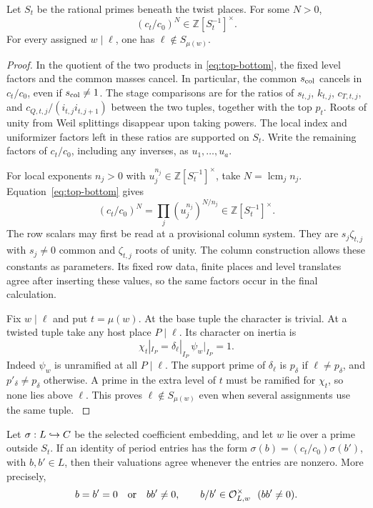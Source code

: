 \begin{lemma}
Let \(S_t\) be the rational primes beneath the twist places.
For some \(N>0\),
\[
 (c_t/c_0)^N\in\mathbb Z[S_t^{-1}]^\times .
\]
For every assigned \(w\mid\ell\), one has \(\ell\notin S_{\mu(w)}\).
\end{lemma}
\begin{proof}
In the quotient of the two products in \eqref{eq:top-bottom},
the fixed level factors and the common masses cancel. In particular,
the common \(s_{\rm col}\) cancels in \(c_t/c_0\), even if \(s_{\rm col}\ne1\).
The stage comparisons are for the ratios of
\(s_{t,j}\), \(k_{t,j}\), \(c_{T,t,j}\), and
\(c_{Q,t,j}/(i_{t,j}i_{t,j+1})\) between the two tuples,
together with the top \(p_t\). Roots of unity from Weil
splittings disappear upon taking powers. The local index and
uniformizer factors left in these ratios are supported on
\(S_t\). Write the remaining factors of \(c_t/c_0\), including any
inverses, as \(u_1,\ldots,u_a\).

For local exponents \(n_j>0\)
with \(u_j^{n_j}\in\mathbb Z[S_t^{-1}]^\times\), take
\(N=\operatorname{lcm}_j n_j\). Equation~\eqref{eq:top-bottom} gives
\[
 (c_t/c_0)^N=\prod_j(u_j^{n_j})^{N/n_j}
                       \in\mathbb Z[S_t^{-1}]^\times.
\] The
row scalars may first be read at a
provisional column system. They are \(s_j\zeta_{t,j}\) with
\(s_j\ne0\) common and \(\zeta_{t,j}\) roots of unity. The
column construction allows these constants as parameters. Its
fixed row data, finite places and level translates agree after
inserting these values, so the same factors occur in the final
calculation.

Fix \(w\mid\ell\) and put \(t=\mu(w)\). At the base tuple the
character is trivial. At a twisted tuple take any host place
\(P\mid\ell\). Its character on inertia is
\[
 \chi_t|_{I_P}=\delta_\ell|_{I_P}\,\psi_w|_{I_P}=1 .
\]
Indeed \(\psi_w\) is unramified at all \(P\mid\ell\). The
support prime of \(\delta_\ell\) is \(p_\delta\) if
\(\ell\ne p_\delta\), and \(p'_\delta\ne p_\delta\) otherwise.
A prime in the extra level of \(t\) must be ramified for
\(\chi_t\), so none lies above \(\ell\). This proves
\(\ell\notin S_{\mu(w)}\) even when several assignments use
the same tuple. \label{cor:period-transport-1}
\end{proof}

\begin{lemma}\label{lem:period-unit-at-assigned-place}
Let \(\sigma:L\hookrightarrow C\) be the selected coefficient
embedding, and let \(w\) lie over a prime outside \(S_t\). If an
identity of period entries has the form
\(\sigma(b)=(c_t/c_0)\sigma(b')\), with \(b,b'\in L\), then their valuations agree whenever the entries are nonzero. More precisely,
\[
 b=b'=0\quad\hbox{or}\quad bb'\ne0,\qquad b/b'\in{\cal O}_{L,w}^{\times}\ \ (bb'\ne0).
\]

\end{lemma}

